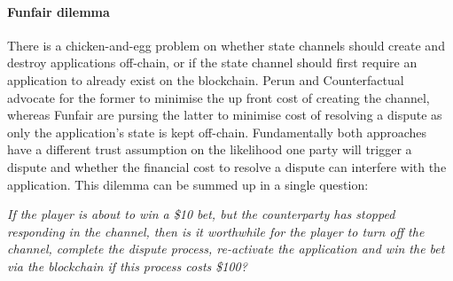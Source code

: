 \documentclass{llncs}
\begin{document}
	
	\paragraph{Funfair dilemma} 
	There is a chicken-and-egg problem on whether state channels should create and destroy applications off-chain, or if the state channel should first require an application to already exist on the blockchain. 
	Perun and Counterfactual advocate for the former to minimise the up front cost of creating the channel, whereas Funfair are pursing the latter to minimise cost of resolving a dispute as only the application's state is kept off-chain. 
	Fundamentally both approaches have a different trust assumption on the likelihood one party will trigger a dispute and whether the financial cost to resolve a dispute can interfere with the application. 
	This dilemma can be summed up in a single question:
	
	\begin{center}
		\textit{If the player is about to win a \$10 bet, but the counterparty has stopped responding in the channel, then is it worthwhile for the player to turn off the channel, complete the dispute process, re-activate the application and win the bet via the blockchain if this process costs \$100?} 
	\end{center} 
	
\end{document}

